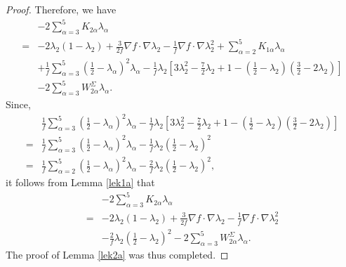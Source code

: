 \documentclass[10pt,a4paper]{amsart}
\begin{document}
\begin{proof}
Therefore, we have
\begin{equation*}
	\begin{aligned}
		&-2\sum_{\alpha=3}^5K_{2\alpha}\lambda_\alpha\\
		=&-2\lambda_{2}(1-\lambda_{2})+\frac{3}{2f}\nabla f\cdot \nabla \lambda_2-\frac{1}{f}\nabla f\cdot \nabla \lambda_2^2+\sum_{\alpha=2}^5K_{1\alpha}\lambda_\alpha\\
		&+\frac{1}{f}\sum_{\alpha=3}^5({\frac{1}{2}}-\lambda_{\alpha})^2\lambda_{\alpha}
		-\frac{1}{f}\lambda_2\left[ 3\lambda^2_2-\frac{7}{2}\lambda_2+1 -(\frac{1}{2}-\lambda_2)({\frac{3}{2}}-2\lambda_{2})\right] \\
		&-2\sum_{\alpha=3}^5 W^{\Sigma}_{2\alpha}\lambda_{\alpha}.
	\end{aligned}
\end{equation*}
Since,
\begin{equation*}
	\begin{aligned}
		&\frac{1}{f}\sum_{\alpha=3}^5({\frac{1}{2}}-\lambda_{\alpha})^2\lambda_{\alpha}
		-\frac{1}{f}\lambda_2\left[ 3\lambda^2_2-\frac{7}{2}\lambda_2+1 -(\frac{1}{2}-\lambda_2)({\frac{3}{2}}-2\lambda_{2})\right] \\
		=&\frac{1}{f}\sum_{\alpha=3}^5({\frac{1}{2}}-\lambda_{\alpha})^2\lambda_{\alpha}
		-\frac{1}{f}\lambda_2({\frac{1}{2}}-\lambda_{2})^2 \\
		=&\frac{1}{f}\sum_{\alpha=2}^5({\frac{1}{2}}-\lambda_{\alpha})^2\lambda_{\alpha}
		-\frac{2}{f}\lambda_2({\frac{1}{2}}-\lambda_{2})^2,
	\end{aligned}
\end{equation*}
it follows from Lemma \ref{lek1a} that
\begin{equation*}
	\begin{aligned}
		&-2\sum_{\alpha=3}^5K_{2\alpha}\lambda_\alpha\\
		=&-2\lambda_{2}(1-\lambda_{2})+\frac{3}{2f}\nabla f\cdot \nabla \lambda_2-\frac{1}{f}\nabla f\cdot \nabla \lambda_2^2\\
		&-\frac{2}{f}\lambda_2({\frac{1}{2}}-\lambda_{2})^2-2\sum_{\alpha=3}^5 W^{\Sigma}_{2\alpha}\lambda_{\alpha}.
	\end{aligned}
\end{equation*}
The proof of Lemma \ref{lek2a} was thus completed.
\end{proof}
\end{document}
